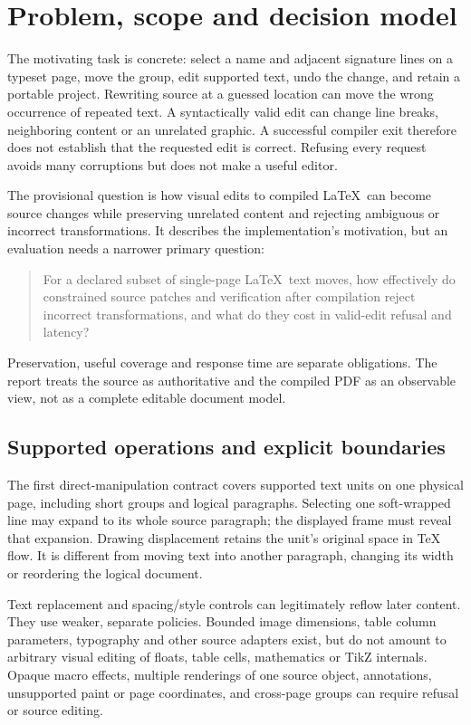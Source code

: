 \section{Problem, scope and decision model}
The motivating task is concrete: select a name and adjacent signature lines
on a typeset page, move the group, edit supported text, undo the change, and
retain a portable project. Rewriting source at a guessed location can move
the wrong occurrence of repeated text. A syntactically valid edit can change
line breaks, neighboring content or an unrelated graphic. A successful
compiler exit therefore does not establish that the requested edit is correct.
Refusing every request avoids many corruptions but does not make a useful editor.

The provisional question is how visual edits to compiled \LaTeX\ can become
source changes while preserving unrelated content and rejecting ambiguous or
incorrect transformations. It describes the implementation's motivation, but
an evaluation needs a narrower primary question:
\begin{quote}
For a declared subset of single-page \LaTeX\ text moves, how effectively do
constrained source patches and verification after compilation reject incorrect
transformations, and what do they cost in valid-edit refusal and latency?
\end{quote}
Preservation, useful coverage and response time are separate obligations.
The report treats the source as authoritative and the compiled PDF as an
observable view, not as a complete editable document model.

\subsection{Supported operations and explicit boundaries}
The first direct-manipulation contract covers supported text units on one
physical page, including short groups and logical paragraphs. Selecting one
soft-wrapped line may expand to its whole source paragraph; the displayed
frame must reveal that expansion. Drawing displacement retains the unit's
original space in TeX flow. It is different from moving text into another
paragraph, changing its width or reordering the logical document.

Text replacement and spacing/style controls can legitimately reflow later
content. They use weaker, separate policies. Bounded image dimensions, table
column parameters, typography and other source adapters exist, but do not
amount to arbitrary visual editing of floats, table cells, mathematics or
TikZ internals. Opaque macro effects, multiple renderings of one source object,
annotations, unsupported paint or page coordinates, and cross-page groups
can require refusal or source editing.

